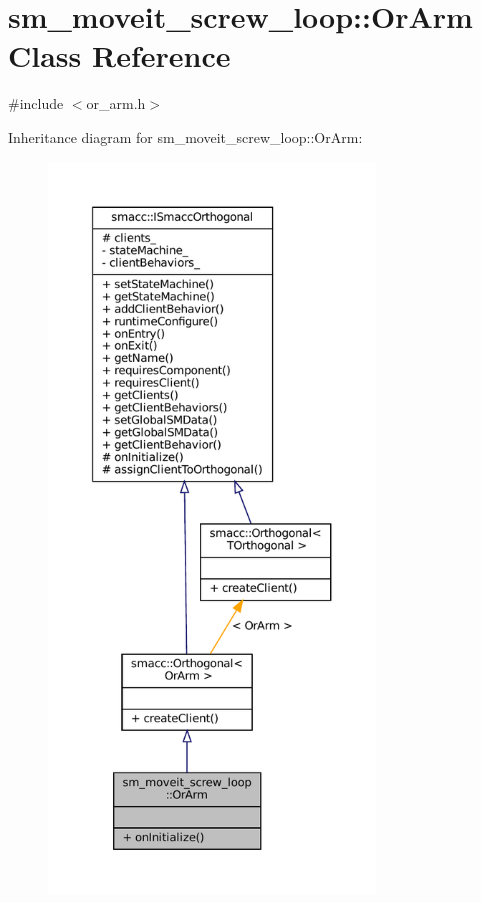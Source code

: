 \hypertarget{classsm__moveit__screw__loop_1_1OrArm}{}\section{sm\+\_\+moveit\+\_\+screw\+\_\+loop\+:\+:Or\+Arm Class Reference}
\label{classsm__moveit__screw__loop_1_1OrArm}


{\ttfamily \#include $<$or\+\_\+arm.\+h$>$}



Inheritance diagram for sm\+\_\+moveit\+\_\+screw\+\_\+loop\+:\+:Or\+Arm\+:
\nopagebreak
\begin{figure}[H]
\begin{center}
\leavevmode
\includegraphics[height=550pt]{classsm__moveit__screw__loop_1_1OrArm__inherit__graph}
\end{center}
\end{figure}


